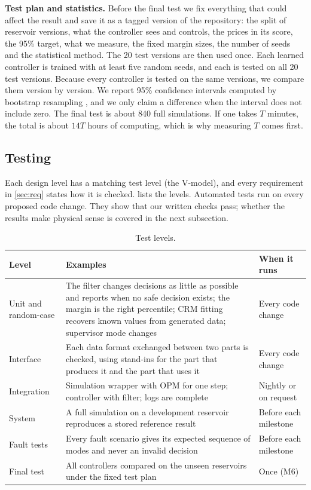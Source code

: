 \documentclass[11pt,letterpaper]{article}
\begin{document}
\textbf{Test plan and statistics.} Before the final test we fix everything that could
affect the result and save it as a tagged version of the repository: the split of reservoir
versions, what the controller sees and controls, the prices in its score, the 95\% target,
what we measure, the fixed margin sizes, the number of seeds and the statistical method.
The 20 test versions are then used once. Each learned controller is trained with at least
five random seeds, and each is tested on all 20 test versions. Because every controller is
tested on the same versions, we compare them version by version. We report 95\% confidence
intervals computed by bootstrap resampling \cite{agarwal2021precipice}, and we only claim a
difference when the interval does not include zero. The final test is about 840 full
simulations. If one takes $T$ minutes, the total is about $14T$ hours of computing, which
is why measuring $T$ comes first.

\subsection{Testing}

Each design level has a matching test level (the V-model), and every requirement in
\cref{sec:req} states how it is checked.  lists the levels. Automated
tests run on every proposed code change. They show that our written checks pass; whether
the results make physical sense is covered in the next subsection.

\begin{table}[!htbp]
\caption{Test levels.}\label{tab:tests}
\small
\begin{tabularx}{\textwidth}{@{}P{2.6cm}LP{2.9cm}@{}}
\toprule
\textbf{Level} & \textbf{Examples} & \textbf{When it runs} \\
\midrule
Unit and random-case & The filter changes decisions as little as possible and reports when no safe decision exists; the margin is the right percentile; CRM fitting recovers known values from generated data; supervisor mode changes & Every code change \\
Interface & Each data format exchanged between two parts is checked, using stand-ins for the part that produces it and the part that uses it & Every code change \\
Integration & Simulation wrapper with OPM for one step; controller with filter; logs are complete & Nightly or on request \\
System & A full simulation on a development reservoir reproduces a stored reference result & Before each milestone \\
Fault tests & Every fault scenario gives its expected sequence of modes and never an invalid decision & Before each milestone \\
Final test & All controllers compared on the unseen reservoirs under the fixed test plan & Once (M6) \\
\bottomrule
\end{tabularx}
\end{table}
\end{document}
